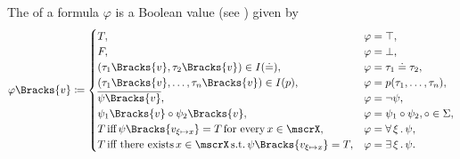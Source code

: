 \begin{definition}
\begin{thmenum}
     The  of a formula \( \varphi \) is a Boolean value (see ) given by
    \begin{equation}\label{eq:def:first_order_valuation/formula_valuation}
      \varphi\Bracks{v} \coloneqq \begin{cases}
        T,                                                                              &\varphi = \top, \\
        F,                                                                              &\varphi = \bot, \\
        (\tau_1\Bracks{v}, \tau_2\Bracks{v}) \in I(\doteq),                         &\varphi = \tau_1 \doteq \tau_2, \\
        (\tau_1\Bracks{v}, \ldots, \tau_n\Bracks{v}) \in I(p),                      &\varphi = p(\tau_1, \ldots, \tau_n), \\
        \overline{\psi\Bracks{v}},                                                          &\varphi = \neg \psi, \\
        \psi_1\Bracks{v} \circ \psi_2\Bracks{v},                                    &\varphi = \psi_1 \circ \psi_2, \circ \in \Sigma, \\
        T \T{iff} \psi\Bracks{v_{\xi \mapsto x}} = T \T{for every} x \in \mscrX,         &\varphi = \qforall{\xi} \psi, \\
        T \T{iff there exists} x \in \mscrX \T{s.t.} \psi\Bracks{v_{\xi \mapsto x}} = T, &\varphi = \qexists{\xi} \psi.
      \end{cases}
    \end{equation}
  \end{thmenum}
\end{definition}

